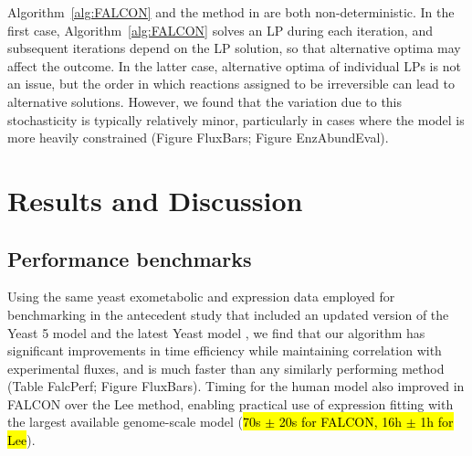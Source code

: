Algorithm~\ref{alg:FALCON} and the method in \citealt{Lee2012} are
both non-deterministic. In the first case, Algorithm~\ref{alg:FALCON}
solves an LP during each iteration, and subsequent iterations depend
on the LP solution, so that alternative optima may affect the outcome.
In the latter case, alternative optima of individual LPs is not an
issue, but the order in which reactions assigned to be irreversible can
lead to alternative solutions. However, we
found that the variation due to this stochasticity is typically 
relatively minor, particularly in cases where the model is more 
heavily constrained (Figure FluxBars; Figure EnzAbundEval).






\section{Results and Discussion}

\subsection{Performance benchmarks}
Using the same yeast exometabolic and expression data employed for
benchmarking in the antecedent study \citep{Lee2012} that included an
updated version of the Yeast 5 model \citep{Heavner2012} and the latest
Yeast model \citep{Aung2013}, we find that
our algorithm has significant improvements in time efficiency while
maintaining correlation with experimental fluxes, and is much faster 
than any similarly performing method (Table FalcPerf; Figure FluxBars).
Timing for the human model also improved in FALCON over 
the Lee method, enabling practical use of expression fitting
with the largest available genome-scale model 
(\hl{70s $\pm$ 20s for FALCON, 16h $\pm$ 1h for Lee}).

